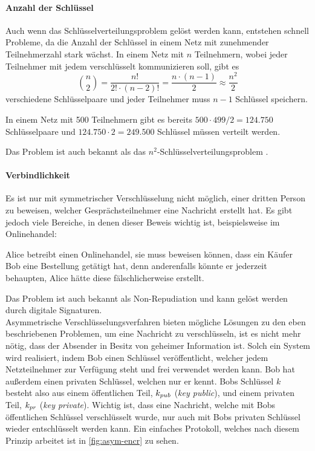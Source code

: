 \paragraph{Anzahl der Schlüssel}
Auch wenn das Schlüsselverteilungsproblem gelöst werden kann, entstehen
schnell Probleme, da die Anzahl der Schlüssel in einem
Netz mit zunehmender Teilnehmerzahl stark wächst. In einem Netz mit $n$
Teilnehmern, wobei jeder Teilnehmer mit jedem verschlüsselt kommunizieren soll, gibt es
\begin{equation*}
  \binom{n}{2} = \frac{n!}{2! \cdot (n-2)!} = \frac{n\cdot(n-1)}{2} \approx \frac{n^2}{2}
\end{equation*}
verschiedene Schlüsselpaare und jeder Teilnehmer muss $n-1$ Schlüssel speichern.
\begin{example}
  In einem Netz mit 500 Teilnehmern gibt es bereits $500 \cdot 499 / 2 = 124.750$ Schlüsselpaare
  und $124.750 \cdot 2 = 249.500$ Schlüssel müssen verteilt werden.
\end{example}
\noindent
Das Problem ist auch bekannt als das
$n^2$-Schlüsselverteilungsproblem \parencite[334-335]{BOOK:crypto}.

\paragraph{Verbindlichkeit}
Es ist nur mit symmetrischer Verschlüsselung nicht möglich, einer dritten Person
zu beweisen, welcher Gesprächsteilnehmer eine Nachricht erstellt hat.
Es gibt jedoch viele Bereiche, in denen dieser Beweis wichtig ist, beispielsweise
im Onlinehandel:
\begin{example}
  Alice betreibt einen Onlinehandel, sie muss beweisen können, dass ein
  Käufer Bob eine Bestellung getätigt hat,
  denn anderenfalls könnte er jederzeit behaupten,
  Alice hätte diese fälschlicherweise erstellt.
\end{example}
\noindent
Das Problem ist auch bekannt als Non-Repudiation \parencite{SITE:nonrepudiation}
und kann gelöst werden durch digitale Signaturen.\\[8pt]
Asymmetrische Verschlüsselungsverfahren bieten mögliche Lösungen zu den eben
beschriebenen Problemen, um eine Nachricht zu verschlüsseln, ist es nicht mehr nötig,
dass der Absender in Besitz von geheimer Information ist. Solch ein System wird
realisiert, indem Bob einen Schlüssel veröffentlicht,
welcher jedem Netzteilnehmer
zur Verfügung steht und frei verwendet werden kann.
Bob hat außerdem einen privaten Schlüssel, welchen nur er kennt.
Bobs Schlüssel $k$ besteht also aus einem öffentlichen Teil, $k_{pub}{}$ (\textit{key public}),
und einem privaten Teil, $k_{pr}{}$ (\textit{key private}). Wichtig ist, dass eine Nachricht,
welche mit Bobs öffentlichen Schlüssel verschlüsselt wurde, nur auch mit Bobs privaten
Schlüssel wieder entschlüsselt werden kann. Ein einfaches Protokoll,
welches nach diesem Prinzip arbeitet ist in \autoref{fig:asym-encr} zu sehen.

